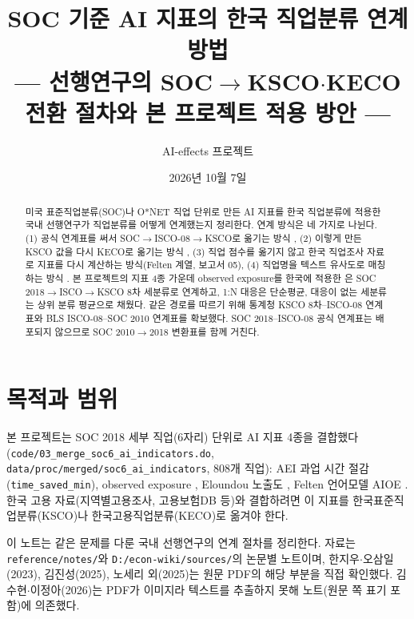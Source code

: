 \documentclass[11pt]{article}
\title{SOC 기준 AI 지표의 한국 직업분류 연계 방법\\[1mm]
\large --- 선행연구의 SOC$\to$KSCO$\cdot$KECO 전환 절차와 본 프로젝트 적용 방안 ---}
\author{AI-effects 프로젝트}
\date{2026년 10월 7일}
\begin{document}
\maketitle

\begin{abstract}
\noindent 미국 표준직업분류(SOC)나 O*NET 직업 단위로 만든 AI 지표를 한국 직업분류에 적용한 국내 선행연구가 직업분류를 어떻게 연계했는지 정리한다. 연계 방식은 네 가지로 나뉜다. (1) 공식 연계표를 써서 SOC$\to$ISCO-08$\to$KSCO로 옮기는 방식 \parencite{han-2023-ai-and-labor-market-change,kim-2026-generative-ai-korean-labor-market,chang-2022-technology-change-skill-labor-demand,kiet-2026-task-distance-occupational-mobility}, (2) 이렇게 만든 KSCO 값을 다시 KECO로 옮기는 방식 \parencite{kim-2025-youth-job-choice-ai-exposure}, (3) 직업 점수를 옮기지 않고 한국 직업조사 자료로 지표를 다시 계산하는 방식(Felten 계열, 보고서 05), (4) 직업명을 텍스트 유사도로 매칭하는 방식 \parencite{keis-2025-ai-job-exposure-labor-demand}. 본 프로젝트의 지표 4종 가운데 observed exposure를 한국에 적용한 \textcite{kim-2026-generative-ai-korean-labor-market}은 SOC 2018$\to$ISCO$\to$KSCO 8차 세분류로 연계하고, 1:N 대응은 단순평균, 대응이 없는 세분류는 상위 분류 평균으로 채웠다. 같은 경로를 따르기 위해 통계청 KSCO 8차–ISCO-08 연계표와 BLS ISCO-08–SOC 2010 연계표를 확보했다. SOC 2018–ISCO-08 공식 연계표는 배포되지 않으므로 SOC 2010$\to$2018 변환표를 함께 거친다.
\end{abstract}

\tableofcontents

\section{목적과 범위}

본 프로젝트는 SOC 2018 세부 직업(6자리) 단위로 AI 지표 4종을 결합했다(\texttt{code/03\_merge\_soc6\_ai\_indicators.do}, \texttt{data/proc/merged/soc6\_ai\_indicators}, 808개 직업): AEI 과업 시간 절감(\texttt{time\_saved\_min}), observed exposure \parencite{massenkoff-2026-labor-market-impacts-of-ai}, Eloundou 노출도 \parencite{eloundou-2023-gpts-are-gpts-an-early}, Felten 언어모델 AIOE \parencite{felten-2023-how-will-language-modelers-like-chatgpt}. 한국 고용 자료(지역별고용조사, 고용보험DB 등)와 결합하려면 이 지표를 한국표준직업분류(KSCO)나 한국고용직업분류(KECO)로 옮겨야 한다.

이 노트는 같은 문제를 다룬 국내 선행연구의 연계 절차를 정리한다. 자료는 \texttt{reference/notes/}와 \texttt{D:/econ-wiki/sources/}의 논문별 노트이며, 한지우$\cdot$오삼일(2023), 김진성(2025), 노세리 외(2025)는 원문 PDF의 해당 부분을 직접 확인했다. 김수현$\cdot$이정아(2026)는 PDF가 이미지라 텍스트를 추출하지 못해 노트(원문 쪽 표기 포함)에 의존했다.
\end{document}
